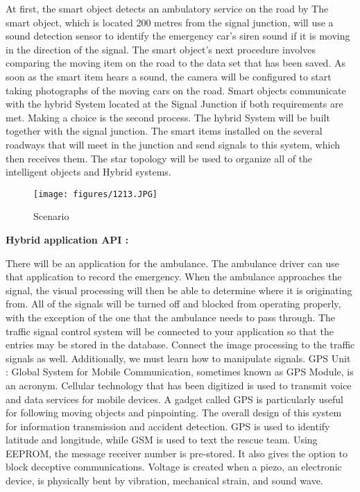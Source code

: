 \documentclass[conference]{IEEEtran}
\begin{document}
At first, the smart object detects an ambulatory service on the road by The smart object, which is located 200 metres from the signal junction, will use a sound detection sensor to identify the emergency car's siren sound if it is moving in the direction of the signal. The smart object's next procedure involves comparing the moving item on the road to the data set that has been saved. As soon as the smart item hears a sound, the camera will be configured to start taking photographs of the moving cars on the road. Smart objects communicate with the hybrid System located at the Signal Junction if both requirements are met. Making a choice is the second process. The hybrid System will be built together with the signal junction. The smart items installed on the several roadways that will meet in the junction and send signals to this system, which then receives them. The star topology will be used to organize all of the intelligent objects and Hybrid systems.\\

\begin{figure}
    \centering
    \texttt{[image: figures/1213.JPG]}
    \caption{Scenario}
    \label{fig:2}
\end{figure}

\textbf{Hybrid application API : }

There will be an application for the ambulance. The ambulance driver can use that application to record the emergency. When the ambulance approaches the signal, the visual processing will then be able to determine where it is originating from. All of the signals will be turned off and blocked from operating properly, with the exception of the one that the ambulance needs to pass through. The traffic signal control system will be connected to your application so that the entries may be stored in the database. Connect the image processing to the traffic signals as well. Additionally, we must learn how to manipulate signals. GPS Unit : Global System for Mobile Communication, sometimes known as GPS Module, is an acronym. Cellular technology that has been digitized is used to transmit voice and data services for mobile devices. A gadget called GPS is particularly useful for following moving objects and pinpointing. The overall design of this system for information transmission and accident detection. GPS is used to identify latitude and longitude, while GSM is used to text the rescue team. Using EEPROM, the message receiver number is pre-stored. It also gives the option to block deceptive communications. Voltage is created when a piezo, an electronic device, is physically bent by vibration, mechanical strain, and sound wave.\\
\end{document}
